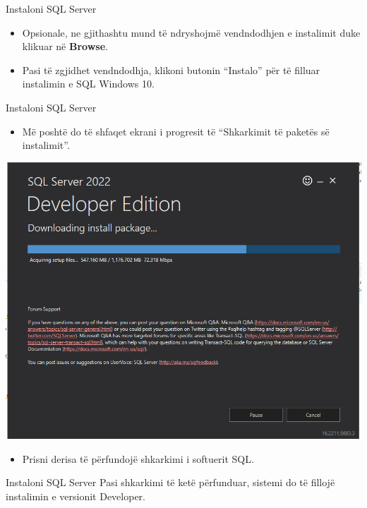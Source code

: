 \documentclass[
  ignorenonframetext,
]{beamer}
\providecommand{\tightlist}{%
  \setlength{\itemsep}{0pt}\setlength{\parskip}{0pt}}
\begin{document}
\begin{frame}{Instaloni SQL Server}
\label{instaloni-sql-server-5}
\begin{itemize}
\item
  Opsionale, ne gjithashtu mund të ndryshojmë vendndodhjen e instalimit
  duke klikuar në \textbf{Browse}.
\item
  Pasi të zgjidhet vendndodhja, klikoni butonin ``Instalo'' për të
  filluar instalimin e SQL Windows 10.
\end{itemize}
\end{frame}

\begin{frame}{Instaloni SQL Server}
\label{instaloni-sql-server-6}
\begin{itemize}
\tightlist
\item
  Më poshtë do të shfaqet ekrani i progresit të ``Shkarkimit të paketës
  së instalimit''.
\end{itemize}

\includegraphics{./Figs/install5.png}

\begin{itemize}
\tightlist
\item
  Prisni derisa të përfundojë shkarkimi i softuerit SQL.
\end{itemize}
\end{frame}

\begin{frame}{Instaloni SQL Server}
\label{instaloni-sql-server-7}
Pasi shkarkimi të ketë përfunduar, sistemi do të fillojë instalimin e
versionit Developer.
\end{frame}
\end{document}
